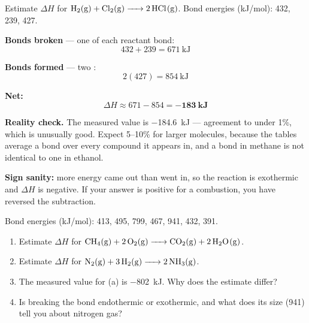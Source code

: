\documentclass{apchem-worksheet}
\begin{document}
\begin{workedexample}
Estimate $\Delta H$ for $\ce{H2(g) + Cl2(g) -> 2HCl(g)}$.
Bond energies (kJ/mol):  432,  239,  427.

\textbf{Bonds broken} --- one of each reactant bond:
\[ 432 + 239 = \SI{671}{\kilo\joule} \]

\textbf{Bonds formed} --- two :
\[ 2(427) = \SI{854}{\kilo\joule} \]

\textbf{Net:}
\[ \Delta H \approx 671 - 854 = \mathbf{-183~kJ} \]

\textbf{Reality check.} The measured value is \SI{-184.6}{\kilo\joule}
--- agreement to under 1\%, which is unusually good. Expect 5--10\% for
larger molecules, because the tables average a bond over every compound
it appears in, and a  bond in methane is not identical to one in
ethanol.

\textbf{Sign sanity:} more energy came out than went in, so the reaction
is exothermic and $\Delta H$ is negative. If your answer is positive for
a combustion, you have reversed the subtraction.
\end{workedexample}

\begin{yourturn}
Bond energies (kJ/mol):  413,  495,  799,
 467,  941,  432,  391.
\begin{enumerate}[leftmargin=*,itemsep=0.5em]
  \item Estimate $\Delta H$ for
        $\ce{CH4(g) + 2O2(g) -> CO2(g) + 2H2O(g)}$. \workspace[2.4cm]
  \item Estimate $\Delta H$ for
        $\ce{N2(g) + 3H2(g) -> 2NH3(g)}$. \workspace[2.2cm]
  \item The measured value for (a) is \SI{-802}{\kilo\joule}. Why does
        the estimate differ? \workspace[1.6cm]
  \item Is breaking the  bond endothermic or exothermic, and what
        does its size (941) tell you about nitrogen gas?
        \workspace[1.6cm]
\end{enumerate}
\end{yourturn}
\end{document}
